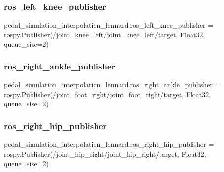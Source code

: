 \subsubsection{\texorpdfstring{ros\_left\_knee\_publisher}{ros\_left\_knee\_publisher}}
{\footnotesize\ttfamily pedal\+\_\+simulation\+\_\+interpolation\+\_\+lennard.\+ros\+\_\+left\+\_\+knee\+\_\+publisher = rospy.\+Publisher(\textquotesingle{}/joint\+\_\+knee\+\_\+left/joint\+\_\+knee\+\_\+left/target\textquotesingle{}, Float32, queue\+\_\+size=2)}

\mbox{\label{namespacepedal__simulation__interpolation__lennard_a4a0183a7877199982e236ccea14e6853}} 
\subsubsection{\texorpdfstring{ros\_right\_ankle\_publisher}{ros\_right\_ankle\_publisher}}
{\footnotesize\ttfamily pedal\+\_\+simulation\+\_\+interpolation\+\_\+lennard.\+ros\+\_\+right\+\_\+ankle\+\_\+publisher = rospy.\+Publisher(\textquotesingle{}/joint\+\_\+foot\+\_\+right/joint\+\_\+foot\+\_\+right/target\textquotesingle{}, Float32, queue\+\_\+size=2)}

\mbox{\label{namespacepedal__simulation__interpolation__lennard_a1f86fb122869f37821b81a25640a51ec}} 
\subsubsection{\texorpdfstring{ros\_right\_hip\_publisher}{ros\_right\_hip\_publisher}}
{\footnotesize\ttfamily pedal\+\_\+simulation\+\_\+interpolation\+\_\+lennard.\+ros\+\_\+right\+\_\+hip\+\_\+publisher = rospy.\+Publisher(\textquotesingle{}/joint\+\_\+hip\+\_\+right/joint\+\_\+hip\+\_\+right/target\textquotesingle{}, Float32, queue\+\_\+size=2)}

